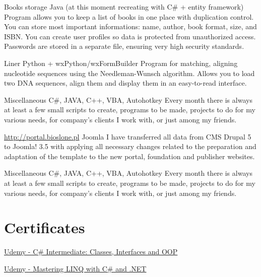 {\begin{template}
            \templateZeroIndent 
            {Books storage}
            {Java (at this moment recreating with C\# + entity framework)}
            {
                Program allows you to keep a list of books in one place with duplication control. You can store most important informations: name, author, book format, size, and ISBN. You can create user profiles so data is protected from unauthorized access. Passwords are stored in a separate file, ensuring very high security standards.
            }
            
            \templateZeroIndent 
            {Liner}
            {Python + wxPython/wxFormBuilder}
            {
                Program for matching, aligning nucleotide sequences using the Needleman-Wunsch algorithm. Allows you to load two DNA sequences, align them and display them in an easy-to-read interface.
            }
            
            \templateZeroIndent 
            {Miscellaneous}
            {C\#, JAVA, C++, VBA, Autohotkey}
            {
                Every month there is always at least a few small scripts to create, programs to be made, projects to do for my various needs, for company's clients I work with, or just among my friends.
            }
            
            \templateZeroIndent
            {\href{http://portal.bioslone.pl}{http://portal.bioslone.pl}}
            {Joomla}
            {
                I have transferred all data from CMS Drupal 5 to Joomla! 3.5 with applying all necessary changes related to the preparation and adaptation of the template to the new portal, foundation and publisher websites.
            }
            
            \templateZeroIndent 
            {Miscellaneous}
            {C\#, JAVA, C++, VBA, Autohotkey}
            {
                Every month there is always at least a few small scripts to create, programs to be made, projects to do for my various needs, for company's clients I work with, or just among my friends.
            }
        \end{template}
        
    \section{Certificates}
        \begin{template}
                {\href{https://www.udemy.com/csharp-intermediate-classes-interfaces-and-oop/\#curriculum}{Udemy - C\# Intermediate: Classes, Interfaces and OOP}}
                {\relax}
                {\relax}
                
                {\href{https://www.udemy.com/linqlinq/learn/v4/content}{Udemy - Mastering LINQ with C\# and .NET}}
                {\relax}
                {\relax}
            
        \end{template}
}